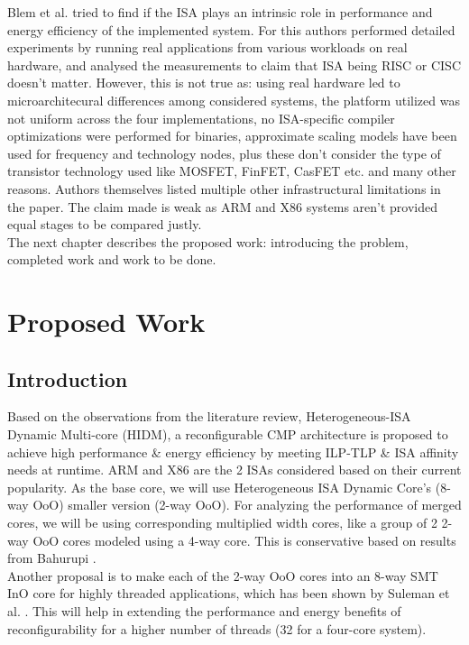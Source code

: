 \documentclass[a4paper,12pt, final]{report}
\begin{document}
\indent Blem et al. \cite{blempower} tried to find if the ISA plays an intrinsic role in performance and energy efficiency of the implemented system. For this authors performed detailed experiments by running real applications from various workloads on real hardware, and analysed the measurements to claim that ISA being RISC or CISC doesn't matter. However, this is not true as: using real hardware led to microarchitecural differences among considered systems, the platform utilized was not uniform across the four implementations, no ISA-specific compiler optimizations were performed for binaries, approximate scaling models have been used for frequency and technology nodes, plus these don't consider the type of transistor technology used like MOSFET, FinFET, CasFET etc. and many other reasons. Authors themselves listed multiple other infrastructural limitations in the paper. The claim made is weak as ARM and X86 systems aren't provided equal stages to be compared justly. \\
\indent The next chapter describes the proposed work: introducing the problem, completed work and work to be done.
\chapter{Proposed Work}
\section{Introduction}
Based on the observations from the literature review, Heterogeneous-ISA Dynamic Multi-core (HIDM), a reconfigurable CMP architecture is proposed to achieve high performance & energy efficiency by meeting ILP-TLP & ISA affinity needs at runtime. ARM and X86 are the 2 ISAs considered based on their current popularity. As the base core, we will use Heterogeneous ISA Dynamic Core’s (8-way OoO) smaller version (2-way OoO). For analyzing the performance of merged cores, we will be using corresponding multiplied width cores, like a group of 2 2-way OoO cores modeled using a 4-way core. This is conservative based on results from Bahurupi \cite{pricopi2012bahurupi}. \\
\indent Another proposal is to make each of the 2-way OoO cores into an 8-way SMT InO core for highly threaded applications, which has been shown by Suleman et al. \cite{suleman2012morphcore}. This will help in extending the performance and energy benefits of reconfigurability for a higher number of threads (32 for a four-core system). 
\end{document}
